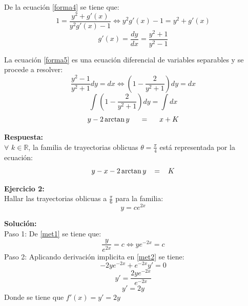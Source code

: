 \documentclass[12pt,letterpaper]{article}
\begin{document}
\begin{titlepage}
\begin{flushleft}
De la ecuación \eqref{forma4} se tiene que:
\begin{equation*} 
1 = \frac{ y^{2} + g'(x)}{y^{2}g'(x) - 1} \Leftrightarrow y^{2}g'(x) -1 = y^{2} + g'(x)
\end{equation*}
\begin{equation} \tag{5} \label{forma5}
g'(x) = \frac{dy}{dx} = \frac{y^{2} + 1} {y^{2} - 1} 
\end{equation}

La ecuación \eqref{forma5} es una ecuación diferencial de variables separables y se procede a resolver:
\begin{equation*}
\frac{y^{2} - 1}{y^{2} + 1}dy = dx \Leftrightarrow (1 - \frac{2}{y^{2}+1})dy = dx
\end{equation*}
\begin{equation*}
\int (1 - \frac{2}{y^{2}+1})dy = \int dx
\end{equation*}	
\begin{equation*}
y - 2 \arctan y \hspace{0.5 cm} = \hspace{0.5 cm} x + K
\end{equation*}
	
\textbf{Respuesta:}\\
\vspace{0.5cm}
$\forall$ $k \in \mathbb R $, la familia de trayectorias oblicuas $ \theta = \frac{\pi}{4}$ está representada por la ecuación:
\begin{equation*}
y - x - 2 \arctan y \hspace{0.3 cm} = \hspace{0.3 cm} K
\end{equation*}

\textbf{Ejercicio 2:} \\
\vspace{0.5cm}
Hallar las trayectorias oblicuas a $ \frac{\pi}{6}$ para la familia: 
\begin{equation} \tag{1} \label{met1}
y = ce^{2x}
\end{equation}

\textbf{Solución:} \\
\vspace{0.5cm}
 Paso 1: De \eqref{met1} se tiene que:
\begin{equation} \tag{2} \label{met2}
\frac{y}{e^{2x}}  = c \Leftrightarrow ye^{-2x} = c
\end{equation}
Paso 2: Aplicando derivación implicita en \eqref{met2} se tiene:
\begin{equation} \tag{3} \label{met3}
-2ye^{-2x} + e^{-2x}y' = 0
\end{equation}
\begin{equation*} 
y' = \frac{2ye^{-2x}}{e^{-2x}}
\end{equation*}
\begin{equation*} 
y' = 2y
\end{equation*}
Donde se tiene que $f'(x) = y' = 2y $


\end{flushleft}
\end{titlepage}
\end{document}
